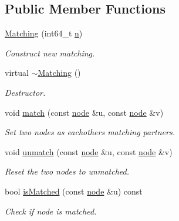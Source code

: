 \subsection*{Public Member Functions}
\begin{DoxyCompactItemize}
\item 
\hyperlink{class_ensemble_clustering_1_1_matching_a5e1de8d09e758fae48909c25484b42b7}{Matching} (int64\-\_\-t \hyperlink{class_ensemble_clustering_1_1_node_map_a511baf014428ed1dece45d9ab94f205b}{n})
\begin{DoxyCompactList}\small\item\em Construct new matching. \end{DoxyCompactList}\item 
virtual \hyperlink{class_ensemble_clustering_1_1_matching_abcc136cf0a7e0b0f2364f2d1b3eb1f2c}{$\sim$\-Matching} ()
\begin{DoxyCompactList}\small\item\em Destructor. \end{DoxyCompactList}\item 
void \hyperlink{class_ensemble_clustering_1_1_matching_a41f6ed1f3b1660fb682c32cf2ade11de}{match} (const \hyperlink{namespace_ensemble_clustering_ae829290aeccd1a420b17a37fd901f114}{node} \&u, const \hyperlink{namespace_ensemble_clustering_ae829290aeccd1a420b17a37fd901f114}{node} \&v)
\begin{DoxyCompactList}\small\item\em Set two nodes as eachothers matching partners. \end{DoxyCompactList}\item 
void \hyperlink{class_ensemble_clustering_1_1_matching_a214fd9e80cb5842f87e2ec909655b5e2}{unmatch} (const \hyperlink{namespace_ensemble_clustering_ae829290aeccd1a420b17a37fd901f114}{node} \&u, const \hyperlink{namespace_ensemble_clustering_ae829290aeccd1a420b17a37fd901f114}{node} \&v)
\begin{DoxyCompactList}\small\item\em Reset the two nodes to unmatched. \end{DoxyCompactList}\item 
bool \hyperlink{class_ensemble_clustering_1_1_matching_a6591583cd8dcd8ddc702cdbddcc42bd0}{is\-Matched} (const \hyperlink{namespace_ensemble_clustering_ae829290aeccd1a420b17a37fd901f114}{node} \&u) const 
\begin{DoxyCompactList}\small\item\em Check if node is matched. \end{DoxyCompactList}\item 

\end{DoxyCompactItemize}
